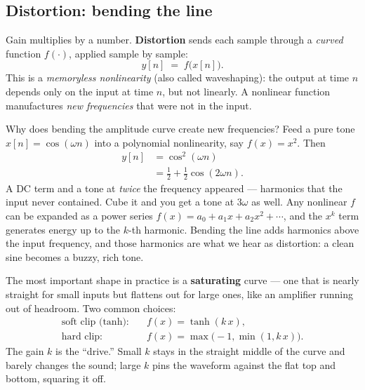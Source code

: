 \subsection{Distortion: bending the line}

Gain multiplies by a number. \textbf{Distortion} sends each sample through a
\emph{curved} function $f(\cdot)$, applied sample by sample:
\begin{equation}
\label{ch28:waveshape}
y[n] \;=\; f\bigl(x[n]\bigr).
\end{equation}
This is a \emph{memoryless nonlinearity} (also called waveshaping): the output at
time $n$ depends only on the input at time $n$, but not linearly. A nonlinear function manufactures
\emph{new frequencies} that were not in the input.

\begin{whybox}
Why does bending the amplitude curve create new frequencies? Feed a pure tone
$x[n]=\cos(\omega n)$ into a polynomial nonlinearity, say $f(x)=x^2$. Then
\begin{align*}
y[n] &= \cos^2(\omega n) \\
     &= \tfrac{1}{2} + \tfrac{1}{2}\cos(2\omega n).
\end{align*}
A DC term and a tone at \emph{twice} the frequency appeared --- harmonics that
the input never contained. Cube it and you get a tone at $3\omega$ as well. Any
nonlinear $f$ can be expanded as a power series $f(x)=a_0+a_1x+a_2x^2+\cdots$,
and the $x^k$ term generates energy up to the $k$-th harmonic. Bending the line
adds harmonics above the input frequency, and those harmonics are what we hear
as distortion: a clean sine becomes a buzzy, rich tone.
\end{whybox}

The most important shape in practice is a \textbf{saturating} curve --- one that
is nearly straight for small inputs but flattens out for large ones, like an
amplifier running out of headroom. Two common choices:
\begin{align}
\text{soft clip (tanh):}\quad & f(x)=\tanh(k\,x), \label{ch28:tanh}\\
\text{hard clip:}\quad & f(x)=\max\!\bigl(-1,\min(1,k\,x)\bigr). \label{ch28:hardclip}
\end{align}
The gain $k$ is the ``drive.'' Small $k$ stays in the straight middle of the
curve and barely changes the sound; large $k$ pins the waveform against the flat
top and bottom, squaring it off.

